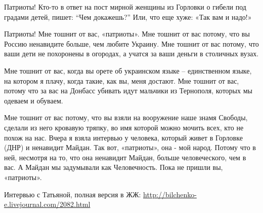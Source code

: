 Патриоты! Кто-то в ответ на пост мирной женщины из Горловки о гибели под
градами детей, пишет: \enquote{Чем докажешь?} Или, что еще хуже: «Так вам и надо!»

Патриоты! Мне тошнит от вас, «патриоты». Мне тошнит от вас потому, что вы
Россию ненавидите больше, чем любите Украину. Мне тошнит от вас потому, что
ваши дети не похоронены в огородах, а учатся за ваши деньги в столичных вузах.

Мне тошнит от вас, когда вы орете об украинском языке – единственном языке, на
котором я плачу, когда такие, как вы, меня достают. Мне тошнит от вас, потому
что за вас на Донбасс убивать идут мальчики из Тернополя, которых мы одеваем и
обуваем. 

Мне тошнит от вас потому, что вы взяли на вооружение наше знамя Свободы,
сделали из него кровавую тряпку, во имя которой можно мочить всех, кто не похож
на нас. Вчера я взяла интервью у человека, который живет в Горловке (ДНР) и
ненавидит Майдан. Так вот, «патриоты», она - мой народ. Потому что в ней,
несмотря на то, что она ненавидит Майдан, больше человеческого, чем в вас. А
Майдан мы задумывали как Человечность. Пока не пришли вы, «патриоты».

Интервью с Татьяной, полная версия в ЖЖ: \url{http://bilchenko-e.livejournal.com/2082.html}

